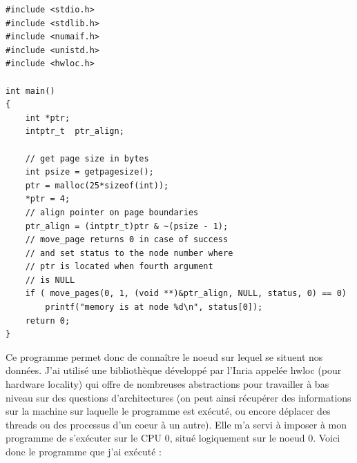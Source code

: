\documentclass{report}
\begin{document}
\begin{lstlisting}
#include <stdio.h>
#include <stdlib.h>
#include <numaif.h>
#include <unistd.h>
#include <hwloc.h>

int main()
{
	int *ptr;
	intptr_t  ptr_align;

	// get page size in bytes
	int psize = getpagesize();
	ptr = malloc(25*sizeof(int));
	*ptr = 4;
	// align pointer on page boundaries
	ptr_align = (intptr_t)ptr & ~(psize - 1);
	// move_page returns 0 in case of success
	// and set status to the node number where 
	// ptr is located when fourth argument
	// is NULL
	if ( move_pages(0, 1, (void **)&ptr_align, NULL, status, 0) == 0)
		printf("memory is at node %d\n", status[0]);
	return 0;
}

\end{lstlisting}

Ce programme permet donc de connaître le noeud sur lequel se situent nos données. J'ai utilisé une bibliothèque
développé par l'Inria appelée hwloc (pour hardware locality) qui offre de nombreuses abstractions pour 
travailler à bas niveau sur des questions d'architectures (on peut ainsi récupérer des informations sur 
la machine sur laquelle le programme est exécuté, ou encore déplacer des threads ou des processus d'un coeur
à un autre). Elle m'a servi à imposer à mon programme de s'exécuter sur le CPU 0, situé logiquement sur le
noeud 0. Voici donc le programme que j'ai exécuté :
\end{document}
